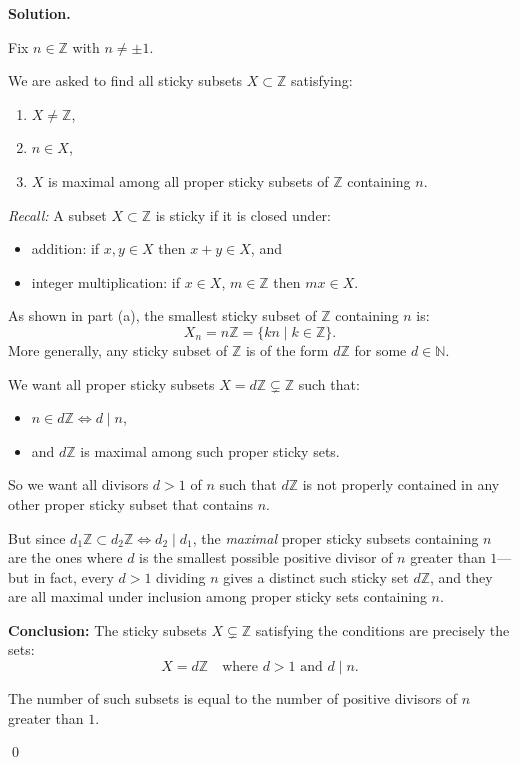\documentclass[12pt]{article}
\newenvironment{solution}{%
	\par\medskip
	\noindent\textbf{Solution.}\par\nopagebreak
}{%
	\hfill \qed \par\medskip
}
\begin{document}
\begin{solution}
Fix $n \in \mathbb{Z}$ with $n \ne \pm 1$.

We are asked to find all sticky subsets $X \subset \mathbb{Z}$ satisfying:

\begin{enumerate}[label=(\roman*)]
	\item $X \ne \mathbb{Z}$,
	\item $n \in X$,
	\item $X$ is maximal among all proper sticky subsets of $\mathbb{Z}$ containing $n$.
\end{enumerate}

\textit{Recall:} A subset $X \subset \mathbb{Z}$ is sticky if it is closed under:
\begin{itemize}
	\item addition: if $x, y \in X$ then $x + y \in X$, and
	\item integer multiplication: if $x \in X$, $m \in \mathbb{Z}$ then $mx \in X$.
\end{itemize}

As shown in part (a), the smallest sticky subset of $\mathbb{Z}$ containing $n$ is:
\[
X_n = n\mathbb{Z} = \{ kn \mid k \in \mathbb{Z} \}.
\]
More generally, any sticky subset of $\mathbb{Z}$ is of the form $d\mathbb{Z}$ for some $d \in \mathbb{N}$.

We want all proper sticky subsets $X = d\mathbb{Z} \subsetneq \mathbb{Z}$ such that:
\begin{itemize}
	\item $n \in d\mathbb{Z} \iff d \mid n$,
	\item and $d\mathbb{Z}$ is maximal among such proper sticky sets.
\end{itemize}

So we want all divisors $d > 1$ of $n$ such that $d\mathbb{Z}$ is not properly contained in any other proper sticky subset that contains $n$.

But since $d_1\mathbb{Z} \subset d_2\mathbb{Z} \iff d_2 \mid d_1$, the \emph{maximal} proper sticky subsets containing $n$ are the ones where $d$ is the smallest possible positive divisor of $n$ greater than $1$—but in fact, every $d > 1$ dividing $n$ gives a distinct such sticky set $d\mathbb{Z}$, and they are all maximal under inclusion among proper sticky sets containing $n$.

\textbf{Conclusion:} The sticky subsets $X \subsetneq \mathbb{Z}$ satisfying the conditions are precisely the sets:
\[
X = d\mathbb{Z} \quad \text{where } d > 1 \text{ and } d \mid n.
\]

\noindent The number of such subsets is equal to the number of positive divisors of $n$ greater than $1$.

	
\end{solution}
\end{document}
